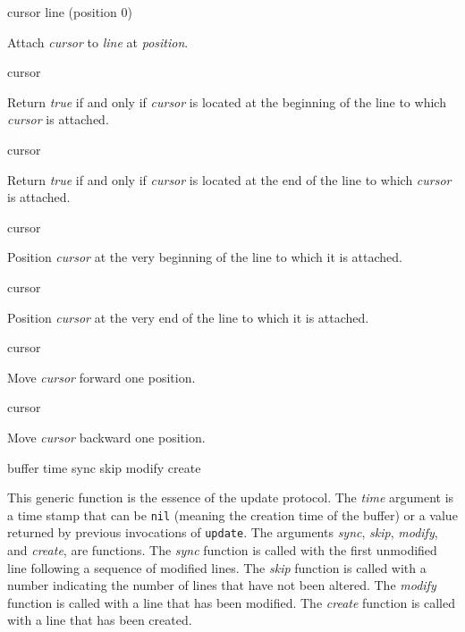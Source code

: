  {cursor line \optional (position 0)}

\vskip 1mm\noindent
Attach \textit{cursor} to \textit{line} at \textit{position}.

 {cursor}

\vskip 1mm\noindent
Return \textit{true} if and only if \textit{cursor} is located at the
beginning of the line to which \textit{cursor} is attached.

 {cursor}

\vskip 1mm\noindent
Return \textit{true} if and only if \textit{cursor} is located at the
end of the line to which \textit{cursor} is attached.

 {cursor}

\vskip 1mm\noindent
Position \textit{cursor} at the very beginning of the line to which it
is attached.

 {cursor}

\vskip 1mm\noindent
Position \textit{cursor} at the very end of the line to which it
is attached.

 {cursor}

\vskip 1mm\noindent
Move \textit{cursor} forward one position.

 {cursor}

\vskip 1mm\noindent
Move \textit{cursor} backward one position.

 {buffer time sync skip modify create}

\vskip 1mm\noindent
This generic function is the essence of the update protocol.
The \textit{time} argument is a time stamp that can be \texttt{nil}
(meaning the creation time of the buffer) or a value returned by
previous invocations of \texttt{update}.  The
arguments \textit{sync}, \textit{skip}, \textit{modify},
and \textit{create}, are functions.  The \textit{sync} function is
called with the first unmodified line following a sequence of modified
lines.  The \textit{skip} function is called with a number indicating
the number of lines that have not been altered.  The \textit{modify}
function is called with a line that has been modified.
The \textit{create} function is called with a line that has been
created.
